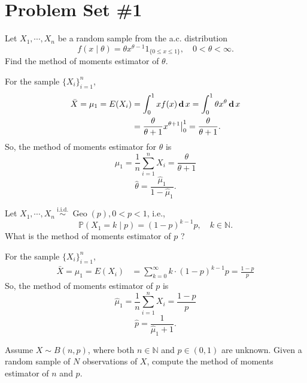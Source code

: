 \section{Problem Set \#1}

\begin{exercise}
    Let \(X_{1}, \cdots, X_{n}\) be a random sample from the a.c. distribution
    \[
    f(x \mid \theta)=\theta x^{\theta-1} 1_{\{0 \leqslant x \leqslant 1\}}, \quad 0<\theta<\infty .
    \]
    Find the method of moments estimator of \(\theta\).
\end{exercise}

\begin{solution}
    For the sample \(\{X_i\}_{i=1}^n\), 
    \[
        \begin{aligned}
            \bar{X}=\mu_1=E(X_i)&=\int_0^1xf(x)\,\mathbf{d}\, x=\int_0^1\theta x^\theta\,\mathbf{d}\, x\\
            &=\frac{\theta}{\theta+1}x^{\theta+1}\big|_0^1=\frac{\theta}{\theta+1}. 
        \end{aligned}
    \]
    So, the method of moments estimator for $\theta$ is 
    \[
        \hat{\mu}_1=\frac{1}{n}\sum_{i=1}^nX_i=\frac{\theta}{\theta+1}
    \]
    \[
        \hat{\theta}=\frac{\hat{\mu}_1}{1-\hat{\mu}_1}. 
    \]
\end{solution}

\begin{exercise}
    Let \(X_{1}, \cdots, X_{n} \stackrel{\text { i.i.d. }}{\sim} \operatorname{Geo}(p), 0<p<1\), i.e.,
    \[
    \mathbb{P}\left(X_{1}=k \mid p\right)=(1-p)^{k-1} p, \quad k \in \mathbb{N} .
    \]
    What is the method of moments estimator of \(p\) ?
\end{exercise}

\begin{solution}
    For the sample \(\{X_i\}_{i=1}^n\), 
    \[
        \begin{aligned}
            \bar{X}=\mu_1=E(X_i)&=\sum_{k=0}^\infty k\cdot (1-p)^{k-1}p=\frac{1-p}{p}
        \end{aligned}
    \]
    So, the method of moments estimator of $p$ is 
    \[
        \hat{\mu}_1=\frac{1}{n}\sum_{i=1}^nX_i=\frac{1-p}{p}
    \]
    \[
        \hat{p}=\frac{1}{\hat{\mu}_1+1}. 
    \]
\end{solution}
    
\begin{exercise}
    Assume \(X \sim B(n, p)\), where both \(n \in \mathbb{N}\) and \(p \in(0,1)\) are unknown. Given a random sample of \(N\) observations of \(X\), compute the method of moments estimator of \(n\) and \(p\).
\end{exercise}

